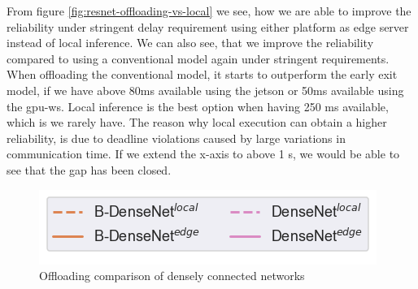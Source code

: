 From figure \ref{fig:resnet-offloading-vs-local} we see, how we are able to improve the reliability under stringent delay requirement using either platform as edge server instead of local inference. We can also see, that we improve the reliability compared to using a conventional model again under stringent requirements. When offloading the conventional model, it starts to outperform the early exit model, if we have above 80ms available using the \gls{jetson} or 50ms available using the \gls{gpu-ws}. Local inference is the best option when having 250 ms available, which is we rarely have. The reason why local execution can obtain a higher reliability, is due to deadline violations caused by large variations in communication time. If we extend the x-axis to above 1 s, we would be able to see that the gap has been closed. 

\begin{figure}
	\captionsetup[subfigure]{justification=centering, farskip=0pt,captionskip=0pt}
	\centering
	\includegraphics[width=.3\linewidth]{figures/edge/gpu_b-densenet_offloading_vs_local_legend}
	\hfill
	\hfill
	\caption[Offloading comparison of densely connected networks]{Offloading comparison of densely connected networks}
	\label{fig:densenet-offloading-vs-local}
\end{figure}

